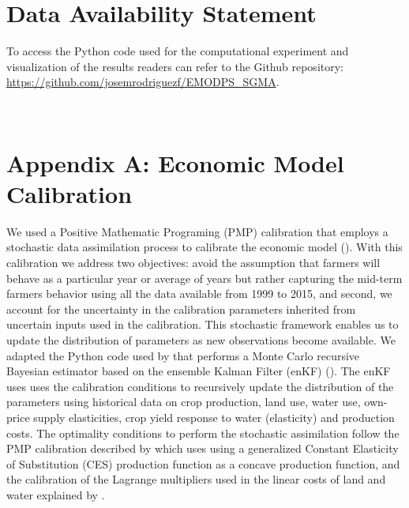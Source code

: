 \documentclass[11pt,a4paper]{article}
\begin{document}
\section*{Data Availability Statement}

To access the Python code used for the computational experiment and  visualization of the results readers can refer to the Github repository: \url{https://github.com/josemrodriguezf/EMODPS_SGMA}.

\newpage
\appendix
\renewcommand\thefigure{\thesection.\arabic{figure}} 
\setcounter{figure}{0}  
\renewcommand{\theequation}{\thesection.\arabic{equation}}\
\setcounter{equation}{0} 
\renewcommand{\thetable}{\thesection.\arabic{table}}\
\setcounter{table}{0} 

\section{Appendix A: Economic Model Calibration}

We used a Positive Mathematic Programing (PMP) calibration that employs a stochastic data assimilation process to calibrate the economic model (\cite{maneta_satellite-driven_2020}).  With this calibration we address two objectives: avoid the assumption that farmers will behave as a particular year or average of years but rather capturing the mid-term farmers behavior using all the data available from 1999 to 2015, and second, we account for the uncertainty in the calibration parameters inherited from uncertain inputs used in the calibration. This stochastic framework enables us to update the distribution of parameters as new observations become available. We adapted the Python code used by \textcite{maneta_satellite-driven_2020} that performs a Monte Carlo recursive Bayesian estimator based on the ensemble Kalman Filter (enKF) (\cite{evensen_sequential_1994}).  The enKF uses uses the calibration conditions to recursively update the distribution of the parameters using historical data on crop production, land use, water use, own-price supply elasticities, crop yield response to water (elasticity) and production costs. The optimality conditions to perform the stochastic assimilation follow the PMP calibration described by \cite{merel_fully_2011} which uses using a generalized Constant Elasticity of Substitution (CES) production function as a concave production function, and the calibration of the Lagrange multipliers used in the linear costs of land and water explained by  \textcite{garnache_calibration_2017}. 
\end{document}
